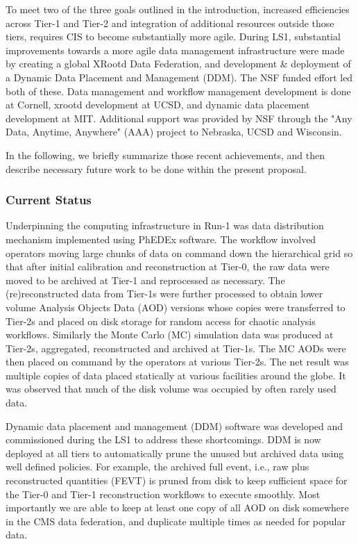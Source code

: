\documentclass[11pt,a4paper]{article}
\begin{document}
To meet two of the three goals outlined in the introduction, increased efficiencies across Tier-1 and Tier-2
and integration of additional resources outside those tiers, requires CIS to become substantially more agile.
During LS1, substantial improvements towards a more agile data management infrastructure 
were made by creating a global XRootd Data Federation, and 
development \& deployment of a Dynamic Data Placement and Management (DDM). 
The NSF funded effort led both of these. Data management and workflow 
management development is done at Cornell, xrootd development at
UCSD, and dynamic data placement development at MIT.  Additional 
support was provided by NSF through the "Any Data, Anytime, Anywhere" (AAA) project to Nebraska, UCSD
and Wisconsin.

In the following, we briefly summarize those recent achievements, and then describe necessary future 
work to be done within the present proposal.

\subsubsection{Current Status}


Underpinning the computing infrastructure in Run-1 was data
distribution mechanism implemented using PhEDEx software. The workflow
involved operators moving large chunks of data on command down the
hierarchical grid so that after initial calibration and reconstruction
at Tier-0, the raw data were moved to be archived at Tier-1 and
reprocessed as necessary. The (re)reconstructed data from Tier-1s were
further processed to obtain lower volume Analysis Objects Data (AOD)
versions whose copies were transferred to Tier-2s and placed on disk
storage for random access for chaotic analysis workflows.  Similarly
the Monte Carlo (MC) simulation data was produced at Tier-2s,
aggregated, reconstructed and archived at Tier-1s. The MC AODs were
then placed on command by the operators at various Tier-2s. The net
result was multiple copies of data placed statically at various
facilities around the globe. It was observed that much of the disk
volume was occupied by often rarely used data.

Dynamic data placement and management (DDM) software was developed and
commissioned during the LS1 to address these shortcomings. DDM is now
deployed at all tiers to automatically prune the unused but archived
data using well defined policies.  For example, the archived full
event, i.e., raw plus reconstructed quantities (FEVT) is pruned from
disk to keep sufficient space for the Tier-0 and Tier-1 reconstruction
workflows to execute smoothly. Most importantly we are able to keep at
least one copy of all AOD on disk somewhere in the CMS data
federation, and duplicate multiple times as needed for popular data.
\end{document}
